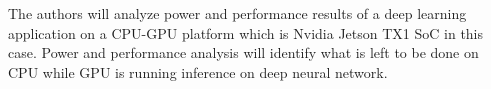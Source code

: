 The authors will analyze power and performance results of a deep learning application on a CPU-GPU platform which is Nvidia Jetson TX1 SoC in this case. Power and performance analysis will identify what is left to be done on CPU while GPU is running inference on deep neural network.